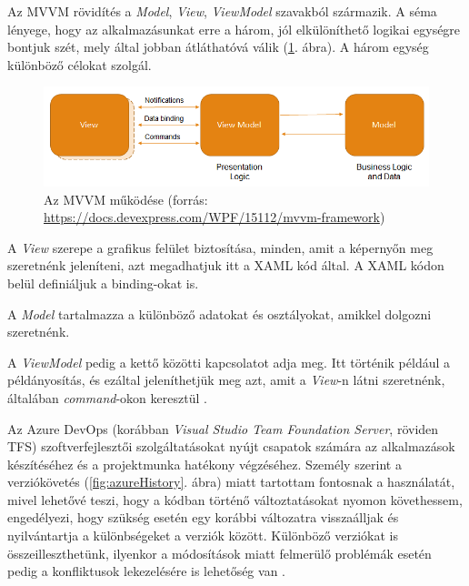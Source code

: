 
Az MVVM rövidítés a \textit{Model}, \textit{View}, \textit{ViewModel} szavakból származik. A séma lényege, hogy az alkalmazásunkat erre a három, jól elkülöníthető logikai egységre bontjuk szét, mely által jobban átláthatóvá válik (\ref{fig:mvvm}. ábra). A három egység különböző célokat szolgál.

\begin{figure}[h]
	\centering
	\includegraphics[scale=0.5]{images/mvvm.png}
	\caption{Az MVVM működése (forrás: \url{https://docs.devexpress.com/WPF/15112/mvvm-framework})}
	\label{fig:mvvm}
\end{figure}

A \textit{View} szerepe a grafikus felület biztosítása, minden, amit a képernyőn meg szeretnénk jeleníteni, azt megadhatjuk itt a XAML kód által. A XAML kódon belül definiáljuk a binding-okat is.

A \textit{Model} tartalmazza a különböző adatokat és osztályokat, amikkel dolgozni szeretnénk.

A \textit{ViewModel} pedig a kettő közötti kapcsolatot adja meg. Itt történik például a példányosítás, és ezáltal jeleníthetjük meg azt, amit a \textit{View}-n látni szeretnénk, általában \textit{command}-okon keresztül \cite{mvvm}.


Az Azure DevOps (korábban \textit{Visual Studio Team Foundation Server}, röviden TFS) szoftverfejlesztői szolgáltatásokat nyújt csapatok számára az alkalmazások készítéséhez és a projektmunka hatékony végzéséhez. Személy szerint a verziókövetés (\ref{fig:azureHistory}. ábra) miatt tartottam fontosnak a használatát, mivel lehetővé teszi, hogy a kódban történő változtatásokat nyomon követhessem, engedélyezi, hogy szükség esetén egy korábbi változatra visszaálljak és nyilvántartja a különbségeket a verziók között. Különböző verziókat is összeilleszthetünk, ilyenkor a módosítások miatt felmerülő problémák esetén pedig a konfliktusok lekezelésére is lehetőség van \cite{azure}.

